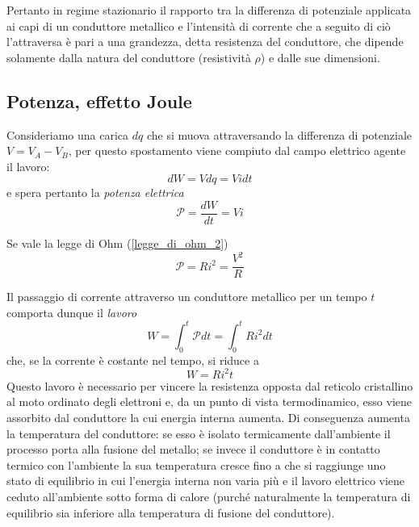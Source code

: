 \documentclass[class=book, crop=false, oneside, 12pt]{standalone}
\begin{document}
Pertanto in regime stazionario il rapporto tra la differenza di potenziale applicata ai capi di un conduttore metallico e l'intensità di corrente che a seguito di ciò l'attraversa è pari a una grandezza, detta resistenza del conduttore, che dipende solamente dalla natura del conduttore (resistività \(\rho\)) e dalle sue dimensioni.

\subsection{Potenza, effetto Joule}

Consideriamo una carica \(dq\) che si muova attraversando la differenza di potenziale \(V= V_A -V_B\), per questo spostamento viene compiuto dal campo elettrico agente il lavoro:
\begin{equation*}
    d W = V dq = V i dt
\end{equation*}
e spera pertanto la \emph{potenza elettrica}
\begin{equation}
    \mathcal{P} = \frac{dW}{dt} = V i
\end{equation}

Se vale la legge di Ohm (\ref{legge_di_ohm_2})
\begin{equation}
    \mathcal{P} = R i^2 = \frac{V^2}{R}
\end{equation}

Il passaggio di corrente attraverso un conduttore metallico per un tempo \(t\) comporta dunque il \emph{lavoro} 
\begin{equation}
    W = \int_0^t \mathcal{P} dt = \int_0^t R i^2 dt
\end{equation}
che, se la corrente è costante nel tempo, si riduce a
\begin{equation}
    W = R i^2 t
\end{equation}
Questo lavoro è necessario per vincere la resistenza opposta dal reticolo cristallino al moto ordinato degli elettroni e, da un punto di vista termodinamico, esso viene assorbito dal conduttore la cui energia interna aumenta. 
Di conseguenza aumenta la temperatura del conduttore: se esso è isolato termicamente dall'ambiente il processo porta alla fusione del metallo; se invece il conduttore è in contatto termico con l'ambiente la sua temperatura cresce fino a che si raggiunge uno stato di equilibrio in cui l'energia interna non varia più e il lavoro elettrico viene ceduto all'ambiente sotto forma di calore (purché naturalmente la temperatura di equilibrio sia inferiore alla temperatura di fusione del conduttore). 
\end{document}
